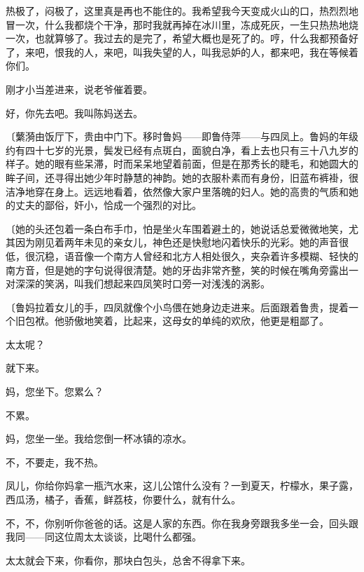 热极了，闷极了，这里真是再也不能住的。我希望我今天变成火山的口，热烈烈地冒一次，什么我都烧个干净，那时我就再掉在冰川里，冻成死灰，一生只热热地烧一次，也就算够了。我过去的是完了，希望大概也是死了的。哼，什么我都预备好了，来吧，恨我的人，来吧，叫我失望的人，叫我忌妒的人，都来吧，我在等候着你们。

刚才小当差进来，说老爷催着要。

好，你先去吧。我叫陈妈送去。

{\fangsong〔蘩漪由饭厅下，贵由中门下。移时鲁妈——即鲁侍萍——与四凤上。鲁妈的年级约有四十七岁的光景，鬓发已经有点斑白，面貌白净，看上去也只有三十八九岁的样子。她的眼有些呆滞，时而呆呆地望着前面，但是在那秀长的睫毛，和她圆大的眸子间，还寻得出她少年时静慧的神韵。她的衣服朴素而有身份，旧蓝布裤褂，很洁净地穿在身上。远远地看着，依然像大家户里落魄的妇人。她的高贵的气质和她的丈夫的鄙俗，奸小，恰成一个强烈的对比。}

{\fangsong〔她的头还包着一条白布手巾，怕是坐火车围着避土的，她说话总爱微微地笑，尤其因为刚见着两年未见的亲女儿，神色还是快慰地闪着快乐的光彩。她的声音很低，很沉稳，语音像一个南方人曾经和北方人相处很久，夹杂着许多模糊、轻快的南方音，但是她的字句说得很清楚。她的牙齿非常齐整，笑的时候在嘴角旁露出一对深深的笑涡，叫我们想起来四凤笑时口旁一对浅浅的涡影。}

{\fangsong〔鲁妈拉着女儿的手，四凤就像个小鸟偎在她身边走进来。后面跟着鲁贵，提着一个旧包袱。他骄傲地笑着，比起来，这母女的单纯的欢欣，他更是粗鄙了。}

太太呢？

就下来。

妈，您坐下。您累么？

不累。

妈，您坐一坐。我给您倒一杯冰镇的凉水。

不，不要走，我不热。

凤儿，你给你妈拿一瓶汽水来，这儿公馆什么没有？一到夏天，柠檬水，果子露，西瓜汤，橘子，香蕉，鲜荔枝，你要什么，就有什么。

不，不，你别听你爸爸的话。这是人家的东西。你在我身旁跟我多坐一会，回头跟我同——同这位周太太谈谈，比喝什么都强。

太太就会下来，你看你，那块白包头，总舍不得拿下来。

